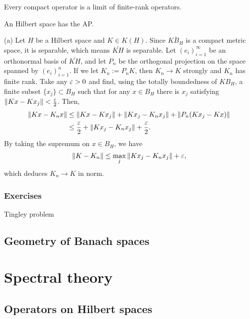 \documentclass{../../large}
\begin{document}
\begin{prb}
Every compact operator is a limit of finite-rank operators.
\begin{parts}
\item An Hilbert space has the AP.
\item
\end{parts}
\end{prb}
\begin{pf}
(a)
Let $H$ be a Hilbert space and $K\in K(H)$.
Since $\bar{KB_H}$ is a compact metric space, it is separable, which means $\bar{KH}$ is separable.
Let $(e_i)_{i=1}^\infty$ be an orthonormal basis of $\bar{KH}$, and let $P_n$ be the orthogonal projection on the space spanned by $(e_i)_{i=1}^n$.
If we let $K_n:=P_nK$, then $K_n\to K$ strongly and $K_n$ has finite rank.
Take any $\varepsilon>0$ and find, using the totally boundedness of $KB_H$, a finite subset $\{x_j\}\subset B_H$ such that for any $x\in B_H$ there is $x_j$ satisfying $\|Kx-Kx_j\|<\frac{\varepsilon}2$.
Then,
\begin{align*}
\|Kx-K_nx\|
&\le\|Kx-Kx_j\|+\|Kx_j-K_nx_j\|+\|P_n(Kx_j-Kx)\|\\
&\le\frac{\varepsilon}2+\|Kx_j-K_nx_j\|+\frac{\varepsilon}2.
\end{align*}
By taking the supremum on $x\in B_H$, we have
\[\|K-K_n\|\le\max_j\|Kx_j-K_nx_j\|+\varepsilon,\]
which deduces $K_n\to K$ in norm.

\end{pf}




\section*{Exercises}
Tingley problem



\chapter{Geometry of Banach spaces}







\part{Spectral theory}

\chapter{Operators on Hilbert spaces}
\end{document}
